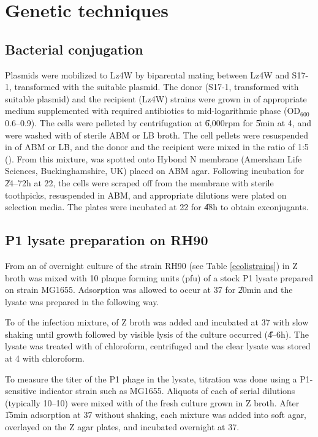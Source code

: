 \section{Genetic techniques}

\subsection{Bacterial conjugation}
\label{conjugation}

Plasmids were mobilized to Lz4W by biparental mating between Lz4W
and  \mbox{S17-1}, transformed with the suitable plasmid.
The donor (S17-1, transformed with suitable plasmid) and the
recipient (Lz4W) strains were grown in  of appropriate
medium supplemented with required antibiotics to mid-logarithmic
phase (OD$_{600}$ 0.6--0.9). The cells were pelleted by
centrifugation at \U{6,000}{rpm} for \U{5}{min} at 4\dg{}, and
were washed with  of sterile ABM or LB broth. The cell
pellets were resuspended in  of ABM or LB, and the donor
and the recipient were mixed in the ratio of 1:5
(). From this mixture,   was spotted onto
Hybond{\scriptsize{\texttrademark}} N\su{+} membrane (Amersham
Life Sciences, Buckinghamshire, UK) placed on ABM agar. Following
incubation for \U{24--72}{h} at 22\dg{}, the cells were scraped
off from the membrane with sterile toothpicks, resuspended in ABM,
and appropriate dilutions were plated on selection media. The
plates were incubated at 22\dg{} for \U{48}{h} to obtain
exconjugants.

\subsection{P1 lysate preparation on RH90}
\label{rh90_lysate}

From an of overnight culture of the strain RH90 (see Table
\ref{ecolistrains})  in Z broth was mixed with 10
plaque forming units (pfu) of a stock P1 lysate prepared on strain
MG1655. Adsorption was allowed to occur at 37\dg{} for \U{20}{min}
and the lysate was prepared in the following way.

To  of the infection mixture,  of Z broth was added
and incubated at 37\dg{} with slow shaking until growth followed
by visible lysis of the culture occurred (\U{4--6}{h}). The lysate
was treated with  of chloroform, centrifuged  and the
clear lysate was stored at 4\dg{} with chloroform.

To measure the titer of the P1 phage in the lysate, titration was
done using a P1-sensitive indicator strain such as MG1655.
Aliquots of  each of serial dilutions (typically
10--10) were mixed with  of the fresh culture
grown in Z broth. After \U{15}{min} adsorption at 37\dg{} without
shaking, each mixture was added into soft agar, overlayed on the Z
agar plates, and incubated overnight at 37\dg{}.

